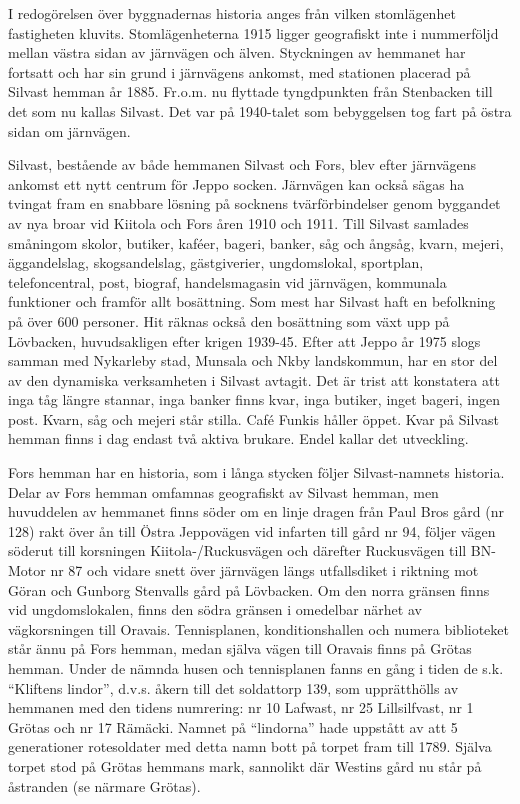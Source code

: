 I redogörelsen över byggnadernas historia anges från vilken stomlägenhet fastigheten kluvits. Stomlägenheterna 1915 ligger geografiskt inte i nummerföljd mellan västra sidan av järnvägen och älven. Styckningen av hemmanet har fortsatt och har sin grund i järnvägens ankomst, med stationen placerad på Silvast hemman år 1885. Fr.o.m. nu flyttade tyngdpunkten från Stenbacken till det som nu kallas Silvast. Det var på 1940-talet som bebyggelsen tog fart på östra sidan om järnvägen.

Silvast, bestående av både hemmanen Silvast och Fors, blev efter järnvägens ankomst ett nytt centrum för Jeppo socken. Järnvägen kan också sägas ha tvingat fram en snabbare lösning på socknens tvärförbindelser genom byggandet av nya broar vid Kiitola och Fors åren 1910 och 1911. Till Silvast samlades småningom skolor, butiker, kaféer, bageri, banker, såg och ångsåg, kvarn, mejeri, äggandelslag, skogsandelslag, gästgiverier, ungdomslokal, sportplan, telefoncentral, post, biograf, handelsmagasin vid järnvägen, kommunala funktioner och framför allt bosättning. Som mest har Silvast haft en befolkning på över 600 personer. Hit räknas också den bosättning som växt upp på Lövbacken, huvudsakligen efter krigen 1939-45. Efter att Jeppo år 1975 slogs samman med Nykarleby stad, Munsala och Nkby landskommun, har en stor del av den dynamiska verksamheten i  Silvast avtagit. Det är trist att konstatera att inga tåg längre stannar, inga banker finns kvar, inga butiker, inget bageri, ingen post. Kvarn, såg och mejeri står stilla. Café Funkis håller öppet. Kvar på Silvast hemman finns i dag endast två aktiva brukare. Endel kallar det utveckling.



Fors hemman har en historia, som i långa stycken följer Silvast-namnets historia. Delar av Fors hemman omfamnas geografiskt av Silvast hemman, men huvuddelen av hemmanet finns söder om en linje dragen från Paul Bros gård (nr 128) rakt över ån till Östra Jeppovägen vid infarten till gård nr 94, följer vägen söderut till korsningen Kiitola-/Ruckusvägen och därefter Ruckusvägen till BN-Motor nr 87 och vidare snett över järnvägen längs utfallsdiket i riktning mot Göran och Gunborg Stenvalls gård på Lövbacken. Om den norra gränsen finns vid ungdomslokalen, finns den södra gränsen i omedelbar närhet av vägkorsningen till Oravais. Tennisplanen, konditionshallen och numera biblioteket står ännu på Fors hemman, medan själva vägen till Oravais finns på Grötas hemman. Under de nämnda husen och tennisplanen fanns en gång i tiden de s.k. ``Kliftens lindor'', d.v.s. åkern till det soldattorp 139, som upprätthölls av hemmanen med den tidens numrering: nr 10 Lafwast, nr 25 Lillsilfvast, nr 1 Grötas och nr 17 Rämäcki. Namnet på ``lindorna'' hade uppstått av att 5 generationer rotesoldater med detta namn bott på torpet fram till 1789. Själva torpet stod på Grötas hemmans mark, sannolikt där Westins gård nu står på åstranden (se närmare Grötas).

